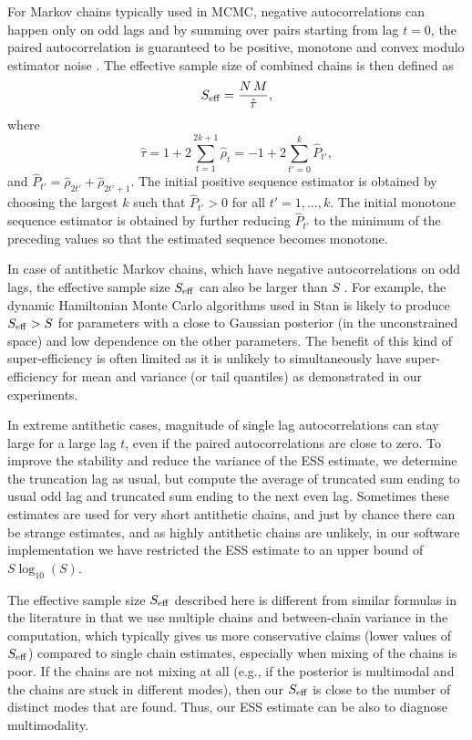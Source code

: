 \documentclass[american,]{article}
\theoremstyle{definition}
\begin{document}
For Markov chains typically used in MCMC, negative autocorrelations
can happen only on odd lags and by summing over pairs starting from
lag \(t=0\), the paired autocorrelation is guaranteed to be positive,
monotone and convex modulo estimator noise \citep{Geyer:1992,
  Geyer:2011}. The effective sample size of combined chains is then
defined as
\begin{equation}
S_{\rm eff} = \frac{N \, M}{\hat{\tau}},
\end{equation}
where
\begin{equation}
\hat{\tau} = 1 + 2 \sum_{t=1}^{2k+1} \hat{\rho}_t = 
-1 + 2 \sum_{t'=0}^{k} \hat{P}_{t'},
\end{equation}
and \(\hat{P}_{t'}=\hat{\rho}_{2t'}+\hat{\rho}_{2t'+1}\). The initial
positive sequence estimator is obtained by choosing the largest \(k\)
such that \(\hat{P}_{t'}>0\) for all \(t' = 1,\ldots,k\). The initial
monotone sequence estimator is obtained by further reducing
\(\hat{P}_{t'}\) to the minimum of the preceding values so that the
estimated sequence becomes monotone.

In case of antithetic Markov chains, which have negative
autocorrelations on odd lags, the effective sample size
\(S_{\rm eff}\) can also be larger than \(S\) . For example, the
dynamic Hamiltonian Monte Carlo algorithms used in Stan
\citep{Hoffman+Gelman:2014, betancourt2017conceptual, StanManual.2.18.0} is likely to
produce \(S_{\rm eff}>S\) for parameters with a close to Gaussian
posterior (in the unconstrained space) and low dependence on the other
parameters.
%
The benefit of this kind of super-efficiency is often
limited as it is unlikely to simultaneously have super-efficiency for
mean and variance (or tail quantiles) as demonstrated in our experiments.

In extreme antithetic cases, magnitude of single lag autocorrelations
can stay large for a large lag $t$, even if the paired
autocorrelations are close to zero. To improve the stability and
reduce the variance of the ESS estimate, we determine the truncation
lag as usual, but compute the average of truncated sum ending to usual
odd lag and truncated sum ending to the next even lag.
%
Sometimes these estimates are used for very short antithetic chains,
and just by chance there can be strange estimates, and as highly
antithetic chains are unlikely, in our software implementation we have
restricted the ESS estimate to an upper bound of $S\log_{10}(S)$.

The effective sample size \(S_{\rm eff}\) described here is different
from similar formulas in the literature in that we use multiple chains
and between-chain variance in the computation, which typically gives us
more conservative claims (lower values of \(S_{\rm eff}\)) compared to
single chain estimates, especially when mixing of the chains is poor. If
the chains are not mixing at all (e.g., if the posterior is multimodal and
the chains are stuck in different modes), then our \(S_{\rm eff}\) is
close to the number of distinct modes that are found. Thus, our ESS estimate can
be also to diagnose multimodality.
\end{document}
